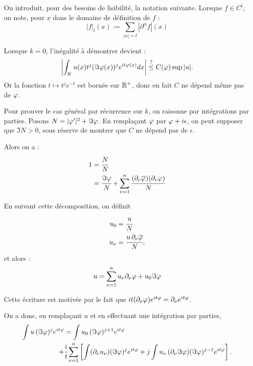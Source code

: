   On introduit, pour des besoins de lisibilité, la notation suivante. Lorsque $f \in C^l$, on note, pour $x$ dans le domaine de définition de $f$ :
  \begin{equation*}
    |f|_l(x) := \sum_{|\alpha|=l}|\partial^{\alpha}f|(x)
  \end{equation*}
  
  Lorsque $k=0$, l'inégalité à démontrer devient :
\begin{equation*}
  \left|\int_K u(x)t^{j}(\Im \varphi(x))^j e^{it\varphi(x)}dx\right| \stackrel{?}{\leq} 
    C(\varphi) \sup |u|.
\end{equation*}
\noindent Or la fonction $t \mapsto t^je^{-t}$ est bornée sur $\mathbb{R}^+$, donc en fait $C$ ne dépend même pas de $\varphi$.

Pour prouver le cas général par récurrence sur $k$, on raisonne par intégrations par parties. Posons $N=|\varphi'|^2+\Im\varphi$. En remplaçant $\varphi$ par $\varphi+i\epsilon$, on peut supposer que $\Im N > 0$, sous réserve de montrer que $C$ ne dépend pas de $\epsilon$.

Alors on a :
\begin{align*}
  1 &= \cfrac{N}{N}\\
  &= \cfrac{\Im \varphi}{N} + \sum_{\nu=1}^{n}\cfrac{(\partial_{\nu}
    \overline{\varphi})(\partial_{\nu}
    \varphi)}{N}
\end{align*}

\noindent En suivant cette décomposition, on définit 
\begin{align*}
u_0&=\cfrac{u}{N}\\
u_{\nu} &= \cfrac{u\,\partial_{\nu}\overline{\varphi}}{N},
\end{align*}
\noindent et alors :
    \begin{equation*}
      u = \sum_{\nu = 1}^{n}u_{\nu}\partial_{\nu} \varphi + u_0 \Im \varphi
    \end{equation*}

\noindent Cette écriture est motivée par le fait que $it(\partial_{\nu}
\varphi)e^{it\varphi} = \partial_{\nu} e^{it\varphi}$.

On a donc, en remplaçant $u$ et en effectuant une intégration par parties,
\begin{align*}
  \int u\,(\Im\varphi)^je^{it\varphi} &= \int u_0\,(\Im\varphi)^{j+1}e^{it\varphi} \\+&
  \cfrac{i}{t} \sum_{\nu=1}^{n}\left[\int (\partial_{\nu}u_{\nu})(\Im
    \varphi)^je^{it\varphi} + j\int u_{\nu}\,(\partial_{\nu}\Im \varphi)(\Im \varphi)^{j-1}e^{it\varphi}\right].
\end{align*}

